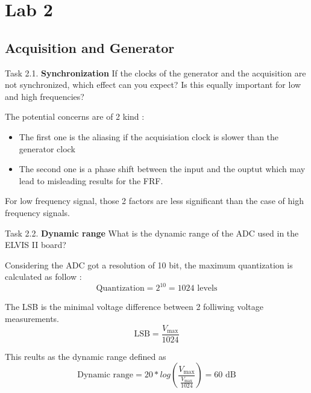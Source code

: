 \setcounter{secnumdepth}{1}

\chapter{Lab 2}

\section{Acquisition and Generator}

\begin{Task}{Task 2.1.}
    \textbf{Synchronization} If the clocks of the generator and the acquisition
    are not synchronized, which effect can you expect? Is this equally important for
    low and high frequencies?
\end{Task}

The potential concerns are of 2 kind :
    \begin{itemize}
        \item The first one is the aliasing if the acquisiation clock is slower than the generator clock
        \item The second one is a phase shift between the input and the ouptut which may lead to misleading results for the FRF.
    \end{itemize}

For low frequency signal, those 2 factors are less significant than the case of high frequency signals.

\begin{Task}{Task 2.2.}
    \textbf{Dynamic range} What is the dynamic range of the ADC used
    in the ELVIS II board?
\end{Task}

Considering the ADC got a resolution of 10 bit, the maximum quantization is calculated as follow :
\begin{equation*}
    \text{Quantization} = 2^{10} = 1024 \text{ levels}
\end{equation*}

The LSB is the minimal voltage difference between 2 folliwing voltage measurements.
\begin{equation*}
    \text{LSB} = \frac{V_\text{max}}{1024}
\end{equation*}

This reults as the dynamic range defined as 
\begin{equation*}
    \text{Dynamic range} = 20*log(\frac{V_\text{max}}{\frac{V_\text{max}}{1024}}) = 60 \text{ dB}
\end{equation*}

